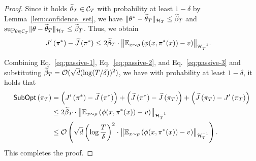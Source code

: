 \begin{proof}
    Since it holds $\widetilde{\theta}_T \in \mathcal{C}_T$ with probability at least $1-\delta$ by Lemma~\ref{lem:confidence_set}, we have $\lVert\theta^*-\widetilde{\theta}_T\rVert_{\mathcal{H}_T} \leq \widetilde{\beta}_T$ and $\sup_{\theta \in \mathcal{C}_T}\lVert\theta-\widetilde{\theta}_T\rVert_{\mathcal{H}_T}  \leq \widetilde{\beta}_T$. Thus, we obtain
    \begin{align}
        \label{eq:passive-3}
        J^{\prime}\left(\pi^{*}\right)-\Jt\left(\pi^*\right) \leq \ & 2 \betat_T \cdot \bignorm{\mathbb{E}_{x \sim \rho} \left(\phi(x,\pi^*(x))-v\right)}_{\H_T^{-1}} .
    \end{align}
    
    Combining Eq.~\eqref{eq:passive-1}, Eq.~\eqref{eq:passive-2}, and Eq.~\eqref{eq:passive-3} and substituting $\widetilde{\beta}_T = \mathcal{O}(\sqrt{d}(\log (T / \delta))^2)$, we have with probability at least $1-\delta$, it holds that
    \begin{align*}
        \subopt\left(\pi_T\right) & =\left(J^{\prime}\left(\pi^{*}\right)-\Jt\left(\pi^*\right)\right)+\left(\Jt\left(\pi^*\right)-\Jt\left(\pi_T\right)\right)+\left(\Jt\left(\pi_T\right)-J^{\prime}\left(\pi_T\right)\right)\\
        & \leq 2 \betat_T \cdot \bignorm{\mathbb{E}_{x \sim \rho} \left(\phi(x,\pi^*(x))-v\right)}_{\H_T^{-1}} \\
        & \leq \O\left(\sqrt{d}\left(\log \frac{T}{\delta}\right)^2 \cdot \bignorm{\mathbb{E}_{x \sim \rho} \left(\phi(x,\pi^*(x))-v\right)}_{\H_T^{-1}}\right).
    \end{align*}
    This completes the proof.
  \end{proof}

